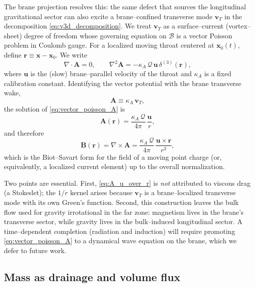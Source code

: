 \documentclass[12pt]{article}
\begin{document}
The brane projection resolves this: the same defect that sources the
longitudinal gravitational sector can also excite a brane--confined transverse
mode $\mathbf{v}_T$ in the decomposition \eqref{eq:v3d_decomposition}.  We
treat $\mathbf{v}_T$ as a surface--current (vortex--sheet) degree of freedom
whose governing equation on $\mathcal{B}$ is a vector Poisson problem in
Coulomb gauge.  For a localized moving throat centered at
$\mathbf{x}_0(t)$, define $\mathbf{r}\equiv \mathbf{x}-\mathbf{x}_0$.  We
write
\begin{equation}
  \nabla\cdot\mathbf{A}=0, \qquad
  \nabla^2 \mathbf{A} = -\kappa_A\,\mathcal{Q}\,\mathbf{u}\,\delta^{(3)}(\mathbf{r}),
  \label{eq:vector_poisson_A}
\end{equation}
where $\mathbf{u}$ is the (slow) brane--parallel velocity of the throat and
$\kappa_A$ is a fixed calibration constant.  Identifying the vector potential
with the brane transverse wake,
\begin{equation}
  \mathbf{A} \equiv \kappa_A\,\mathbf{v}_T,
  \label{eq:A_from_vT}
\end{equation}
the solution of \eqref{eq:vector_poisson_A} is
\begin{equation}
  \mathbf{A}(\mathbf{r}) = \frac{\kappa_A\,\mathcal{Q}}{4\pi}\,\frac{\mathbf{u}}{r},
  \label{eq:A_u_over_r}
\end{equation}
and therefore
\begin{equation}
  \mathbf{B}(\mathbf{r})
  = \nabla\times\mathbf{A}
  = \frac{\kappa_A\,\mathcal{Q}}{4\pi}\,\frac{\mathbf{u}\times\mathbf{r}}{r^3},
  \label{eq:biot_savart_point}
\end{equation}
which is the Biot--Savart form for the field of a moving point charge (or,
equivalently, a localized current element) up to the overall normalization.

Two points are essential.  First, \eqref{eq:A_u_over_r} is \emph{not} attributed
to viscous drag (a Stokeslet); the $1/r$ kernel arises because $\mathbf{v}_T$
is a brane--localized transverse mode with its own Green's function.  Second,
this construction leaves the bulk flow used for gravity irrotational in the
far zone: magnetism lives in the brane's transverse sector, while gravity
lives in the bulk--induced longitudinal sector.  A time--dependent completion
(radiation and induction) will require promoting \eqref{eq:vector_poisson_A} to
a dynamical wave equation on the brane, which we defer to future work.

\subsection{Mass as drainage and volume flux}
\label{subsec:mass_flux}
\end{document}
